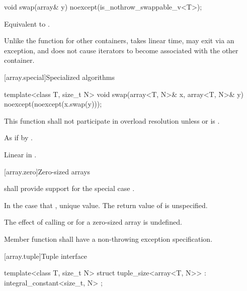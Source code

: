 %
\begin{itemdecl}
void swap(array& y) noexcept(is_nothrow_swappable_v<T>);
\end{itemdecl}

\begin{itemdescr}
\pnum
\effects Equivalent to .

\pnum
\begin{note}
Unlike the  function for other containers, 
takes linear time, may exit via an exception, and does not cause iterators to
become associated with the other container.
\end{note}
\end{itemdescr}

[array.special]{Specialized algorithms}

%
\begin{itemdecl}
template<class T, size_t N>
  void swap(array<T, N>& x, array<T, N>& y) noexcept(noexcept(x.swap(y)));
\end{itemdecl}

\begin{itemdescr}
\pnum\remarks
This function shall not participate in overload resolution
unless  or  is .

\pnum\effects
As if by .

\pnum
\complexity Linear in .
\end{itemdescr}

[array.zero]{Zero-sized arrays}

%
\pnum{} shall provide support for the special case .

\pnum In the case that ,  unique value.
The return value of  is unspecified.

\pnum
The effect of calling  or  for a zero-sized array is
undefined.

\pnum
Member function  shall have a
non-throwing exception specification.

[array.tuple]{Tuple interface}
%
%
%
%
\begin{itemdecl}
template<class T, size_t N>
  struct tuple_size<array<T, N>> : integral_constant<size_t, N> { };
\end{itemdecl}

